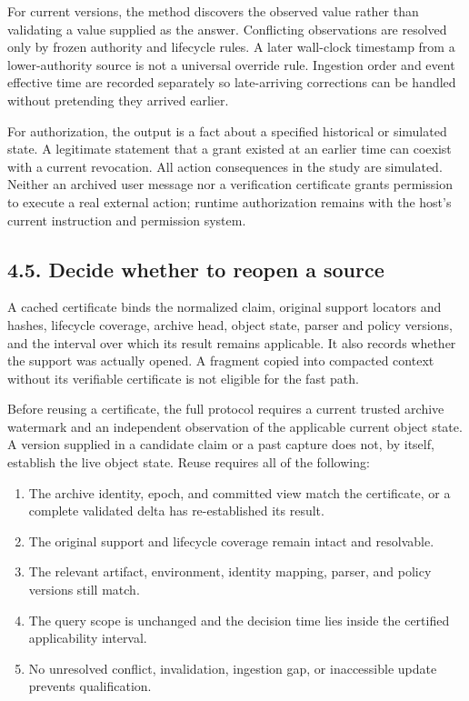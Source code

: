 \documentclass[
  11pt,
  a4paper,
]{article}
\providecommand{\tightlist}{%
  \setlength{\itemsep}{0pt}\setlength{\parskip}{0pt}}
\begin{document}
For current versions, the method discovers the observed value rather
than validating a value supplied as the answer. Conflicting observations
are resolved only by frozen authority and lifecycle rules. A later
wall-clock timestamp from a lower-authority source is not a universal
override rule. Ingestion order and event effective time are recorded
separately so late-arriving corrections can be handled without
pretending they arrived earlier.

For authorization, the output is a fact about a specified historical or
simulated state. A legitimate statement that a grant existed at an
earlier time can coexist with a current revocation. All action
consequences in the study are simulated. Neither an archived user
message nor a verification certificate grants permission to execute a
real external action; runtime authorization remains with the host's
current instruction and permission system.

\subsection{4.5. Decide whether to reopen a
source}\label{decide-whether-to-reopen-a-source}

A cached certificate binds the normalized claim, original support
locators and hashes, lifecycle coverage, archive head, object state,
parser and policy versions, and the interval over which its result
remains applicable. It also records whether the support was actually
opened. A fragment copied into compacted context without its verifiable
certificate is not eligible for the fast path.

Before reusing a certificate, the full protocol requires a current
trusted archive watermark and an independent observation of the
applicable current object state. A version supplied in a candidate claim
or a past capture does not, by itself, establish the live object state.
Reuse requires all of the following:

\begin{enumerate}
\def\labelenumi{\arabic{enumi}.}
\tightlist
\item
  The archive identity, epoch, and committed view match the certificate,
  or a complete validated delta has re-established its result.
\item
  The original support and lifecycle coverage remain intact and
  resolvable.
\item
  The relevant artifact, environment, identity mapping, parser, and
  policy versions still match.
\item
  The query scope is unchanged and the decision time lies inside the
  certified applicability interval.
\item
  No unresolved conflict, invalidation, ingestion gap, or inaccessible
  update prevents qualification.
\end{enumerate}
\end{document}
